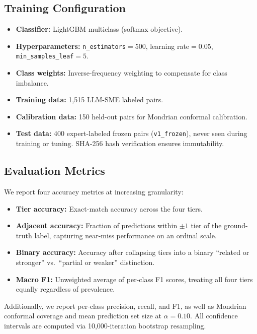 \subsection{Training Configuration}

\begin{itemize}
    \item \textbf{Classifier:} LightGBM multiclass (softmax objective).
    \item \textbf{Hyperparameters:} \texttt{n\_estimators}${}=500$,
          learning rate${}=0.05$,
          \texttt{min\_samples\_leaf}${}=5$.
    \item \textbf{Class weights:} Inverse-frequency weighting to
          compensate for class imbalance.
    \item \textbf{Training data:} 1,515 LLM-SME labeled pairs.
    \item \textbf{Calibration data:} 150 held-out pairs for Mondrian
          conformal calibration.
    \item \textbf{Test data:} 400 expert-labeled frozen pairs
          (\texttt{v1\_frozen}), never seen during training or tuning.
          SHA-256 hash verification ensures immutability.
\end{itemize}

\subsection{Evaluation Metrics}

We report four accuracy metrics at increasing granularity:
\begin{itemize}
    \item \textbf{Tier accuracy:} Exact-match accuracy across the four
          tiers.
    \item \textbf{Adjacent accuracy:} Fraction of predictions within
          $\pm 1$ tier of the ground-truth label, capturing near-miss
          performance on an ordinal scale.
    \item \textbf{Binary accuracy:} Accuracy after collapsing tiers
          into a binary ``related or stronger'' vs.\ ``partial or
          weaker'' distinction.
    \item \textbf{Macro F1:} Unweighted average of per-class F1 scores,
          treating all four tiers equally regardless of prevalence.
\end{itemize}

Additionally, we report per-class precision, recall, and F1, as well
as Mondrian conformal coverage and mean prediction set size at
$\alpha = 0.10$. All confidence intervals are computed via
10,000-iteration bootstrap resampling.

